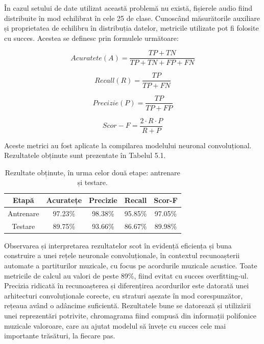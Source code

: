 \documentclass[a4paper,12pt]{report}
\begin{document}
În cazul setului de date utilizat această problemă nu există, 
fișierele audio fiind distribuite în mod echilibrat în cele 25 de clase.
Cunoscând măsurătorile auxiliare și proprietatea 
de echilibru în distribuția datelor, metricile utilizate pot fi 
folosite cu succes. Acestea se definesc 
prin formulele următoare:

\begin{equation*}
    Acuratete (A) = \frac{TP+TN}{TP+TN+FP+FN} 
\end{equation*}

\begin{equation*}
    Recall (R) = \frac{TP}{TP+FN} 
\end{equation*}

\begin{equation*}
    Precizie (P) = \frac{TP}{TP+FP} 
\end{equation*}

\begin{equation*}
    Scor-F = \frac{2 \cdot R \cdot P}{R + P} 
\end{equation*}

Aceste metrici au fost aplicate la compilarea modelului neuronal
convoluțional. Rezultatele obținute sunt prezentate în Tabelul 5.1.

\begin{table}[h!]
    \begin{center}
        \begin{tabular}{ | c | c | c | c | c | }
            \hline 
                Etapă & Acuratețe & Precizie & Recall & Scor-F \\
                \hline \hline 
                Antrenare & 97.23\% & 98.38\% & 95.85\% & 97.05\%  \\
                \hline
                Testare & 89.75\% & 93.66\% & 86.67\% & 89.98\%  \\
            \hline
        \end{tabular}
        \caption{Rezultate obținute, în urma celor două etape: antrenare și testare.}
    \end{center}
\end{table}

Observarea și interpretarea rezultatelor scot în evidență eficiența 
și buna construire a unei rețele neuronale convoluționale, în 
contextul recunoașterii automate a partiturilor muzicale, cu
focus pe acordurile muzicale acustice. Toate metricile 
de calcul au valori de peste 89\%, fiind evitat cu succes overfitting-ul.
Precizia ridicată în recunoașterea și diferențirea acordurilor 
este datorată unei arhitecturi convoluționale corecte, cu straturi 
așezate în mod corespunzător, rețeaua având o adâncime suficientă.
Rezultatele bune se datorează și utilizării unei reprezentări 
potrivite, chromagrama fiind compusă din informații polifonice 
muzicale valoroare, care au ajutat modelul să învețe cu succes
cele mai importante trăsături, la fiecare pas.
\end{document}
